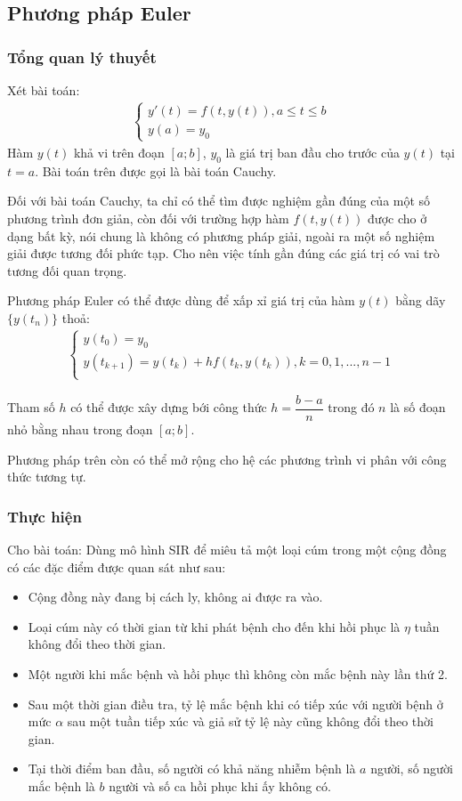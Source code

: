 \documentclass[a4paper]{article}
\begin{document}
\subsection{Phương pháp Euler}
\subsubsection{Tổng quan lý thuyết}
Xét bài toán: 
\begin{align}\label{Cauchy}
    \begin{cases}
       y'(t) = f(t,y(t)), a \leq t \leq b \\
       y(a) = y_0
    \end{cases}
\end{align}
Hàm $y(t)$ khả vi trên đoạn $[a;b]$, $y_0$ là giá trị ban đầu cho trước của $y(t)$ tại $t=a$. Bài toán trên được gọi là bài toán Cauchy.

Đối với bài toán Cauchy, ta chỉ có thể tìm được nghiệm gần đúng của một số phương trình đơn giản, còn đối với trường hợp hàm $f(t, y(t))$ được cho ở dạng bất kỳ, nói chung là không có phương pháp giải, ngoài ra một số nghiệm giải được tương đối phức tạp. Cho nên việc tính gần đúng các giá trị có vai trò tương đối quan trọng. 

Phương pháp Euler có thể được dùng để xấp xỉ giá trị của hàm $y(t)$ bằng dãy $\{ y(t_n)\} $ thoả:
\begin{align}\label{Cauchy}
    \begin{cases}
        y(t_0) = y_0 \\
        y(t_{k+1}) = y(t_k)+ hf(t_k,y(t_k)), k=0,1,...,n-1  \\
    \end{cases}
\end{align}

Tham số $h$ có thể được xây dựng bới công thức $h=\dfrac{b-a}{n}$ trong đó $n$ là số đoạn nhỏ bằng nhau trong đoạn $[a;b]$. 

Phương pháp trên còn có thể mở rộng cho hệ các phương trình vi phân với công thức tương tự.

\subsubsection{Thực hiện}\label{sec: 2.1.2}
Cho bài toán: Dùng mô hình SIR để miêu tả một loại cúm trong một cộng đồng có các đặc điểm được quan sát như sau:
\begin{itemize}
    \item Cộng đồng này đang bị cách ly, không ai được ra vào.
    \item Loại cúm này có thời gian từ khi phát bệnh cho đến khi hồi phục là $\eta$ tuần không đổi theo thời gian.
    \item Một người khi mắc bệnh và hồi phục thì không còn mắc bệnh này lần thứ 2.
    \item Sau một thời gian điều tra, tỷ lệ mắc bệnh khi có tiếp xúc với người bệnh ở mức $\alpha$ sau một tuần tiếp xúc và giả sử tỷ lệ này cũng không đổi theo thời gian.
    \item Tại thời điểm ban đầu, số người có khả năng nhiễm bệnh là $a$ người, số người mắc bệnh là $b$ người và số ca hồi phục khi ấy không có.
\end{itemize}
\end{document}
